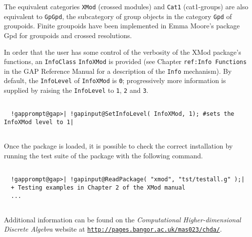 \documentclass[a4paper,11pt]{report}
\begin{document}
{ The equivalent categories \texttt{XMod} (crossed modules) and \texttt{Cat1} (cat1-groups) are also equivalent to \texttt{GpGpd}, the subcategory of group objects in the category \texttt{Gpd} of groupoids. Finite groupoids have been implemented in Emma Moore's package \textsf{Gpd} \cite{M1} for groupoids and crossed resolutions. 

  In order that the user has some control of the verbosity of the \textsf{XMod} package's functions, an \texttt{InfoClass} \texttt{InfoXMod} is provided (see Chapter \texttt{ref:Info Functions} in the \textsf{GAP} Reference Manual for a description of the \texttt{Info} mechanism). By default, the \texttt{InfoLevel} of \texttt{InfoXMod} is \texttt{0}; progressively more information is supplied by raising the \texttt{InfoLevel} to \texttt{1}, \texttt{2} and \texttt{3}. 
\begin{Verbatim}[commandchars=!@|,fontsize=\small,frame=single,label=Example]
  
  !gapprompt@gap>| !gapinput@SetInfoLevel( InfoXMod, 1); #sets the InfoXMod level to 1|
  
\end{Verbatim}
 Once the package is loaded, it is possible to check the correct installation
by running the test suite of the package with the following command. 
\begin{Verbatim}[commandchars=!@|,fontsize=\small,frame=single,label=Example]
  
  !gapprompt@gap>| !gapinput@ReadPackage( "xmod", "tst/testall.g" );|
  + Testing examples in Chapter 2 of the XMod manual
  ... 
  
\end{Verbatim}
 Additional information can be found on the \emph{Computational Higher-dimensional Discrete Algebra} website at \href{http://pages.bangor.ac.uk/~mas023/chda/} {\texttt{http://pages.bangor.ac.uk/\texttt{}mas023/chda/}}. }

            
\end{document}
